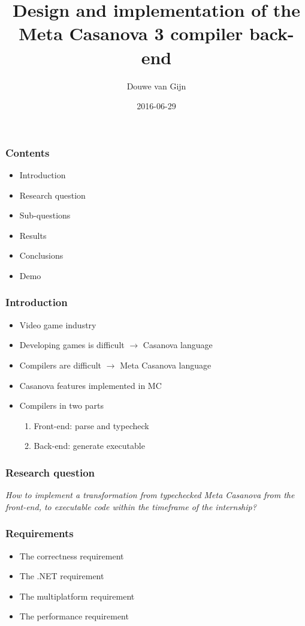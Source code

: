 \documentclass[xetex,serif,aspectratio=169]{beamer}
\title{Design and implementation of the\\Meta Casanova 3 compiler back-end}
\author{Douwe van Gijn}
\date{2016-06-29}
\begin{document}
\begin{frame}
\titlepage

\end{frame}\begin{frame}\frametitle{Contents}
\begin{itemize}
    \item Introduction
    \item Research question
    \item Sub-questions
    \item Results
    \item Conclusions
    \item Demo
\end{itemize}

\end{frame}\begin{frame}\frametitle{Introduction}
\begin{itemize}
    \item Video game industry
    \item Developing games is difficult $\longrightarrow$ Casanova language
    \item Compilers are difficult $\longrightarrow$ Meta Casanova language
    \item Casanova features implemented in MC
    \item Compilers in two parts
    \begin{enumerate}
        \item Front-end: parse and typecheck
        \item Back-end: generate executable
    \end{enumerate}
\end{itemize}

\end{frame}\begin{frame}\frametitle{Research question}
\textit{How to implement a transformation from typechecked Meta Casanova from the front-end, to executable code within the timeframe of the internship?}

\end{frame}\begin{frame}\frametitle{Requirements}
\begin{itemize}
    \item The correctness requirement
    \item The .NET requirement
    \item The multiplatform requirement
    \item The performance requirement
\end{itemize}


\end{frame}
\end{document}
